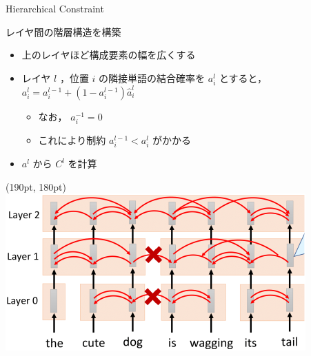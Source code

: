 \documentclass[unicode, 12pt, aspectratio=43]{beamer}
\begin{document}
\begin{frame}[label={sec:orgecf2472}]{Hierarchical Constraint}
\vspace{-2.5cm}
\begin{block}{レイヤ間の階層構造を構築}
\begin{itemize}
\item 上のレイヤほど構成要素の幅を広くする
\item レイヤ \(l\) ，位置 \(i\) の隣接単語の結合確率を \(a_i^l\) とすると， \(a_i^l = a_i^{l-1} + (1 - a_i^{l-1})\hat{a}_i^l\)
\begin{itemize}
\item なお， \(a_i^{-1} = 0\)
\item これにより制約 \(a_i^{l-1} < a_i^l\) がかかる
\end{itemize}
\item \(a^l\) から \(C^l\) を計算
\end{itemize}

\begin{textblock*}{0.45\linewidth}(190pt, 180pt)
    \centering
    \includegraphics[width=\linewidth]{./figure/Figure1_a.pdf}
\end{textblock*}
\end{block}
\end{frame}
\end{document}

